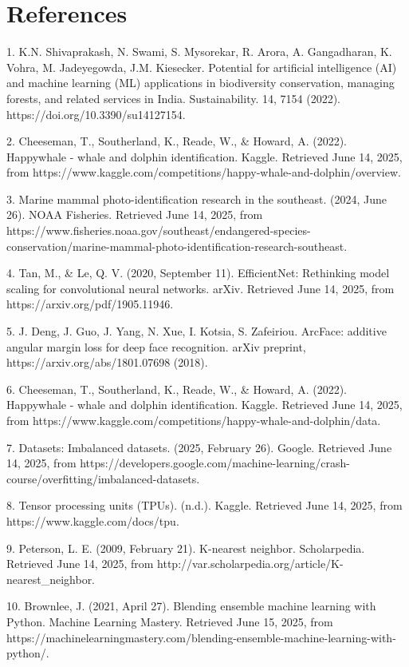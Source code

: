 \documentclass[twocolumn]{article}
\begin{document}
\section{References}
1. K.N. Shivaprakash, N. Swami, S. Mysorekar, R. Arora, A. Gangadharan, K. Vohra, M. Jadeyegowda, J.M. Kiesecker. Potential for artificial intelligence (AI) and machine learning (ML) applications in biodiversity conservation, managing forests, and related services in India. Sustainability. 14, 7154 (2022). https://doi.org/10.3390/su14127154.

2. Cheeseman, T., Southerland, K., Reade, W., \& Howard, A. (2022). Happywhale - whale and dolphin identification. Kaggle. Retrieved June 14, 2025, from https://www.kaggle.com/competitions/happy-whale-and-dolphin/overview.

3. Marine mammal photo-identification research in the southeast. (2024, June 26). NOAA Fisheries. Retrieved June 14, 2025, from https://www.fisheries.noaa.gov/southeast/endangered-species-conservation/marine-mammal-photo-identification-research-southeast.

4. Tan, M., & Le, Q. V. (2020, September 11). EfficientNet: Rethinking model scaling for convolutional neural networks. arXiv. Retrieved June 14, 2025, from https://arxiv.org/pdf/1905.11946.

5. J. Deng, J. Guo, J. Yang, N. Xue, I. Kotsia, S. Zafeiriou. ArcFace: additive angular margin loss for deep face recognition. arXiv preprint, https://arxiv.org/abs/1801.07698 (2018).

6. Cheeseman, T., Southerland, K., Reade, W., \& Howard, A. (2022). Happywhale - whale and dolphin identification. Kaggle. Retrieved June 14, 2025, from https://www.kaggle.com/competitions/happy-whale-and-dolphin/data.

7. Datasets: Imbalanced datasets. (2025, February 26). Google. Retrieved June 14, 2025, from https://developers.google.com/machine-learning/crash-course/overfitting/imbalanced-datasets.

8. Tensor processing units (TPUs). (n.d.). Kaggle. Retrieved June 14, 2025, from https://www.kaggle.com/docs/tpu.

9. Peterson, L. E. (2009, February 21). K-nearest neighbor. Scholarpedia. Retrieved June 14, 2025, from http://var.scholarpedia.org/article/K-nearest\_neighbor.

10. Brownlee, J. (2021, April 27). Blending ensemble machine learning with Python. Machine Learning Mastery. Retrieved June 15, 2025, from https://machinelearningmastery.com/blending-ensemble-machine-learning-with-python/.
\end{document}
